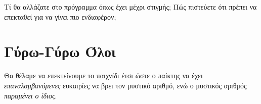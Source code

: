 \documentclass[a4paper,11pt,oneside]{book}
\begin{document}
\begin{step}
Τί θα αλλάζατε στο πρόγραμμα όπως έχει μέχρι στιγμής; Πώς πιστεύετε ότι πρέπει να επεκταθεί για να γίνει πιο ενδιαφέρον;

\marginnote[14pt]{\icondiscuss}
\dottedline

\dottedline
\end{step}

\section{Γύρω-Γύρω Όλοι}



Θα θέλαμε να επεκτείνουμε το παιχνίδι έτσι ώστε ο παίκτης να έχει \emph{επαναλαμβανόμενες} ευκαιρίες να βρει τον μυστικό αριθμό, ενώ ο μυστικός αριθμός \emph{παραμένει ο ίδιος}.
\end{document}
